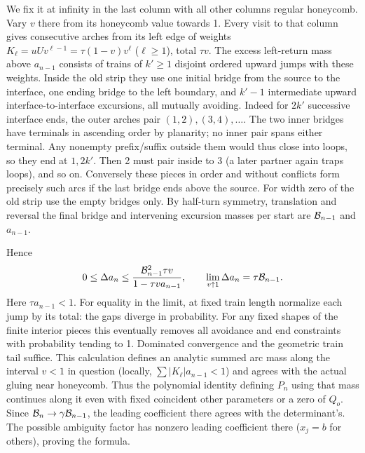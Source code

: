 \documentclass[11pt]{article}
\numberwithin{equation}{section}
\theoremstyle{definition}\newtheorem{definition}[theorem]{Definition}
\theoremstyle{remark}\newtheorem{remark}[theorem]{Remark}
\begin{document}
We fix it at infinity in the last column with all other columns regular honeycomb. Vary \(v\) there from its honeycomb value towards 1. Every visit to that column gives consecutive arches from its left edge of weights \(K_\ell=uU v^{\ell-1}=\tau(1-v)v^\ell\) (\(\ell\ge1\)), total \(\tau v\). The excess left-return mass above \(a_{n-1}\) consists of trains of \(k'\ge1\) disjoint ordered upward jumps with these weights. Inside the old strip they use one initial bridge from the source to the interface, one ending bridge to the left boundary, and \(k'-1\) intermediate upward interface-to-interface excursions, all mutually avoiding. Indeed for \(2k'\) successive interface ends, the outer arches pair \((1,2),(3,4),\ldots\). The two inner bridges have terminals in ascending order by planarity; no inner pair spans either terminal. Any nonempty prefix/suffix outside them would thus close into loops, so they end at \(1,2k'\). Then 2 must pair inside to 3 (a later partner again traps loops), and so on. Conversely these pieces in order and without conflicts form precisely such arcs if the last bridge ends above the source. For width zero of the old strip use the empty bridges only. By half-turn symmetry, translation and reversal the final bridge and intervening excursion masses per start are \({\cal B}_{n-1}\) and \(a_{n-1}\).

Hence
\[
 0\le \Delta a_n\le
 \frac{{\cal B}_{n-1}^2\tau v}{1-\tau v a_{n-1}},
 \qquad \lim_{v\uparrow1}\Delta a_n=\tau {\cal B}_{n-1}.
\]
Here \(\tau a_{n-1}<1\). For equality in the limit, at fixed train length normalize each jump by its total: the gaps diverge in probability. For any fixed shapes of the finite interior pieces this eventually removes all avoidance and end constraints with probability tending to 1. Dominated convergence and the geometric train tail suffice. This calculation defines an analytic summed arc mass along the interval \(v<1\) in question (locally, \(\sum |K_\ell|a_{n-1}<1\)) and agrees with the actual gluing near honeycomb. Thus the polynomial identity defining \(P_n\) using that mass continues along it even with fixed coincident other parameters or a zero of \(Q_o\). Since \({\cal B}_n\to\gamma{\cal B}_{n-1}\), the leading coefficient there agrees with the determinant's. The possible ambiguity factor has nonzero leading coefficient there (\(x_j=b\) for others), proving the formula.
\end{document}
